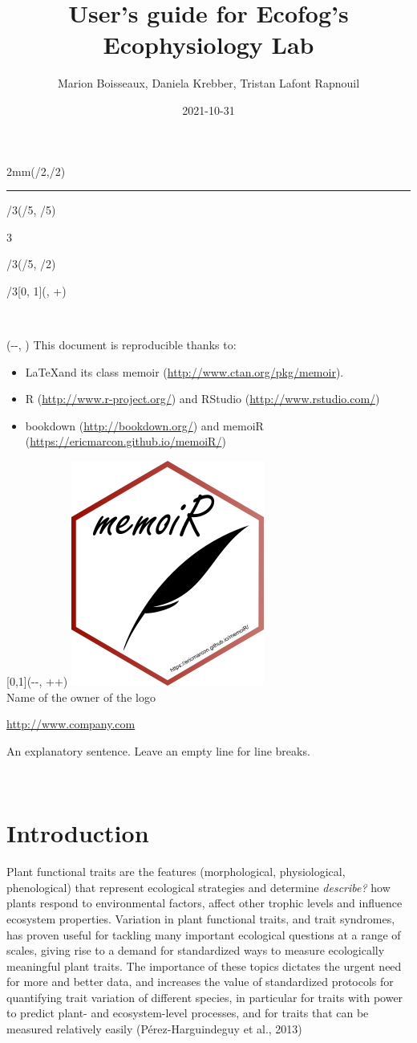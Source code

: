 \documentclass[
  12pt,
  american,
  a4paper,
  extrafontsizes,onecolumn,openright
  ]{memoir}
\title{User's guide for Ecofog's Ecophysiology Lab}
\author{Marion Boisseaux, Daniela Krebber, Tristan Lafont Rapnouil}
\date{2021-10-31}
\makeatletter
\newcommand{\MemoirChapStyle}{daleif1}
\newcommand{\MemoirPageStyle}{Ruled}
\newlength\widthw %
\newcommand*{\SmallMargins}{
  \setlrmarginsandblock{1.5in}{1.5in}{*}
  \setmarginnotes{0.1in}{0.1in}{0.1in}
 \setulmarginsandblock{1.5in}{1in}{*}
  \checkandfixthelayout
  \ch@ngetext
  \clearpage
  \setlength{\widthw}{\textwidth+\marginparsep+\marginparwidth}
  \footnotesatfoot
  \chapterstyle{\MemoirChapStyle}  %
  \pagestyle{\MemoirPageStyle}
}
\newcommand{\LargeMargins}{\SmallMargins}
\newcommand{\MainTitlePage}[2]{
  \SmallMargins %
  \pagestyle{empty} %
  \textblockorigin{\stockwidth-\paperwidth-\trimedge}{\trimtop} %
  \begin{textblock*}{2mm}(\spinemargin/2,\uppermargin/2)
    \rule{1pt}{\paperheight-\uppermargin}
  \end{textblock*}
  \begin{textblock*}{\paperwidth*2/3}(\paperwidth/5, \paperheight/5)
    \flushright
    \begin{Spacing}{3}
      {\fontfamily{qtm}\selectfont\fontsize{45}{45}\selectfont\textsc{\thetitle}}
    \end{Spacing}
  \end{textblock*}
    \begin{textblock*}{\paperwidth*2/3}(\paperwidth/5, \paperheight/2)
    \flushright
    {\fontfamily{qtm}\huge\theauthor}
  \end{textblock*}
    \begin{textblock*}{\paperwidth*2/3}[0, 1](\spinemargin, \uppermargin+\textheight)
    \normalfont\thedate
  \end{textblock*}
  ~\\ %
  \newpage
  \textblockorigin{\trimedge}{\trimtop} %
  \begin{textblock*}{\textwidth}(\paperwidth-\spinemargin-\textwidth, \uppermargin)
    #1
  \end{textblock*}
  \begin{textblock*}{\textwidth}[0,1](\paperwidth-\spinemargin-\textwidth, \uppermargin+\textheight+\footskip)
    \centering
    \includegraphics[width=\paperwidth/4]{logo}\\ \bigskip
    #2
  \end{textblock*}
  ~\\ %
  \newpage
}
\makeatother
\begin{document}
\frontmatter



\cleardoublepage

\MainTitlePage{This document is reproducible thanks to:

\begin{itemize}
  \item \LaTeX and its class memoir (\url{http://www.ctan.org/pkg/memoir}).
  \item R (\url{http://www.r-project.org/}) and RStudio (\url{http://www.rstudio.com/})
  \item bookdown (\url{http://bookdown.org/}) and memoiR (\url{https://ericmarcon.github.io/memoiR/})
\end{itemize}}{Name of the owner of the logo

\url{http://www.company.com}

An explanatory sentence.
Leave an empty line for line breaks.}







\LargeMargins
{
\hypersetup{linkcolor=}
\setcounter{tocdepth}{2}
\tableofcontents
}



\LargeMargins
\mainmatter

\hypertarget{intro}{%
\chapter{Introduction}\label{intro}}

Plant functional traits are the features (morphological, physiological, phenological) that represent ecological strategies and determine \emph{describe?} how plants respond to environmental factors, affect other trophic levels and influence ecosystem properties. Variation in plant functional traits, and trait syndromes, has proven useful for tackling many important ecological questions at a range of scales, giving rise to a demand for standardized ways to measure ecologically meaningful plant traits. The importance of these topics dictates the urgent need for more and better data, and increases the value of standardized protocols for quantifying trait variation of different species, in particular for traits with power to predict plant- and ecosystem-level processes, and for traits that can be measured relatively easily (Pérez-Harguindeguy et al., 2013)
\end{document}
